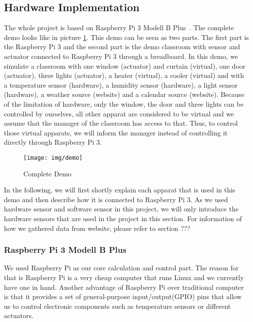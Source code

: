 \documentclass[runningheads]{llncs}
\begin{document}
\subsection{Hardware Implementation}
\label{imp:hard_imp}
The whole project is based on Raspberry Pi 3 Modell B Plus~\cite{pi3}. The complete demo looks like in picture \ref{pic:demo}. This demo can be seen as two parts. The first part is the Raspberry Pi 3 and the second part is the demo classroom with sensor and actuator connected to Raspberry Pi 3 through a breadboard. In this demo, we simulate a classroom with one window (actuator) and curtain (virtual), one door (actuator), three lights (actuator), a heater (virtual), a cooler (virtual) and with a temperature sensor (hardware), a humidity sensor (hardware), a light sensor (hardware), a weather source (website) and a calendar source (website). Because of the limitation of hardware, only the window, the door and three lights can be controlled by ourselves, all other apparat are considered to be virtual and we assume that the manager of the classroom has access to that. Thus, to control those virtual apparats, we will inform the manager instead of controlling it directly through Raspberry Pi 3.

\begin{figure}[H]
\centering
\texttt{[image: img/demo]}
\caption{Complete Demo} 
\label{pic:demo}
\end{figure}

In the following, we will first shortly explain each apparat that is used in this demo and then describe how it is connected to Raspberry Pi 3. As we used hardware sensor and software sensor in this project, we will only introduce the hardware sensors that are used in the project in this section. For information of how we gathered data from website, please refer to section ???

\subsubsection{Raspberry Pi 3 Modell B Plus}\hfill
\label{hard_imp:pi3}
\newline
We used Raspberry Pi as our core calculation and control part. The reason for that is Raspberry Pi is a very cheap computer that runs Linux and we currently have one in hand. Another advantage of Raspberry Pi over traditional computer is that it provides a set of general-purpose input/output(GPIO) pins that allow us to control electronic components such as temperature sensors or different actuators.
\end{document}
